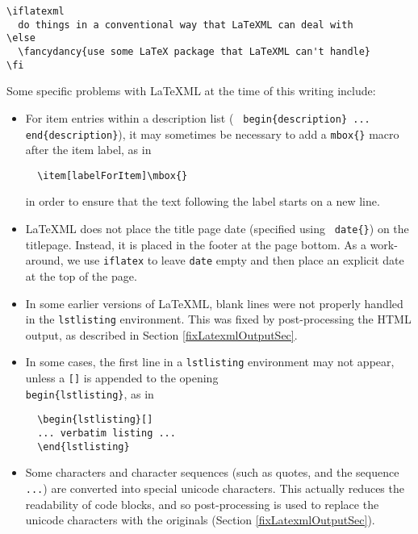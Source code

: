 \documentclass{article}
\begin{document}
\begin{lstlisting}[]
\iflatexml
  do things in a conventional way that LaTeXML can deal with
\else
  \fancydancy{use some LaTeX package that LaTeXML can't handle}
\fi
\end{lstlisting}

Some specific problems with LaTeXML at the time of this writing
include:

\begin{itemize}

\item For item entries within a description list ( {\tt \BKS
begin\{description\} ... \BKS end\{description\}}), it may sometimes
be necessary to add a {\tt \BKS mbox\{\}} macro after the item
label, as in
\begin{verbatim}
  \item[labelForItem]\mbox{}
\end{verbatim}
in order to ensure that the text following the label starts on a new
line.

\item LaTeXML does not place the title page date (specified using {\tt
\BKS date\{\}}) on the titlepage. Instead, it is placed in the
footer at the page bottom. As a work-around, we use {\tt \BKS iflatex} to
leave {\tt \BKS date} empty and then place an explicit date at the top of
the page.

\item In some earlier versions of LaTeXML, blank lines were not
properly handled in the {\tt lstlisting} environment. This was fixed by
post-processing the HTML output, as described in Section
\ref{fixLatexmlOutputSec}.

\item In some cases, the first line in a {\tt lstlisting} environment
may not appear, unless a {\tt []} is appended to the opening \\
{\tt \BKS begin\{lstlisting\}}, as in
%
\begin{verbatim}
  \begin{lstlisting}[]
  ... verbatim listing ...
  \end{lstlisting}
\end{verbatim}
%

\item Some characters and character sequences (such as quotes, and the
sequence {\tt ...}) are converted into special unicode characters.
This actually reduces the readability of code blocks, and so
post-processing is used to replace the unicode characters with the
originals (Section \ref{fixLatexmlOutputSec}).

\end{itemize}
\end{document}
